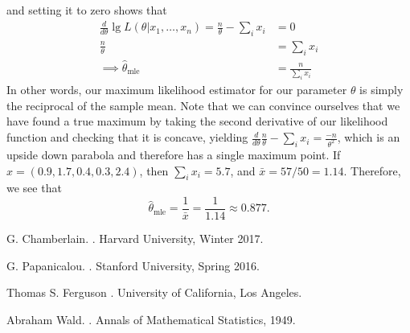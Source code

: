 \documentclass[12pt]{article}  \usepackage{algorithm2e} \usepackage{amsmath} \usepackage{amsthm} \usepackage{amsfonts} \usepackage{bbm} \usepackage{color,soul} \usepackage{framed} \usepackage[margin=0.5in]{geometry} \usepackage{hyperref} \usepackage{mathtools} \usepackage[dvipsnames]{xcolor}
\begin{document}
and setting it to zero shows that   \begin{align*} \frac{d}{d \theta} \lg L(\theta |x_1, \ldots, x_n) = \frac{n}{\theta} - \sum_i x_i &= 0 \\ \frac{n}{\theta} &= \sum_i x_i \\ \implies \hat{\theta}_{\text{mle}} &= \frac{n}{\sum_i x_i} \end{align*}  In other words, our maximum likelihood estimator for our parameter $\theta$ is simply the reciprocal of the sample mean. Note that we can convince ourselves that we have found a true maximum by taking the second derivative of our likelihood function and checking that it is concave, yielding  $\frac{d}{d \theta} \frac{n}{\theta} - \sum_i x_i = \frac{-n}{\theta^2}$, which is an upside down parabola and therefore has a single maximum point.  If $x = (0.9, 1.7, 0.4, 0.3, 2.4)$, then $\sum_i x_i = 5.7$, and $\bar{x} = 57/50 = 1.14$. Therefore, we see that  \[ \hat{\theta}_{\text{mle}} = \frac{1}{\bar{x}} = \frac{1}{1.14} \approx 0.877. \] 


\begin{thebibliography}{10}
G. Chamberlain.
.
\newblock Harvard University, Winter 2017.

G. Papanicalou.
.
\newblock Stanford University, Spring 2016.

Thomas S. Ferguson
.
\newblock University of California, Los Angeles.

Abraham Wald.
.
\newblock Annals of Mathematical Statistics, 1949.

\end{thebibliography}
  
\end{document}
